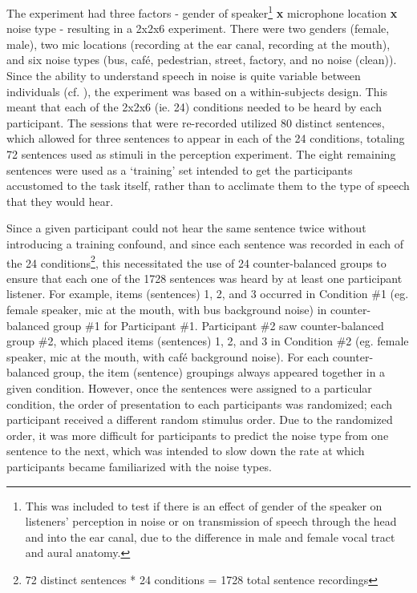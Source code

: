 The experiment had three factors - gender of speaker\footnote{This was included to test if there is an effect of gender of the speaker on listeners' perception in noise or on transmission of speech through the head and into the ear canal, due to the difference in male and female vocal tract and aural anatomy.} \textbf{x} microphone location \textbf{x} noise type - resulting in a 2x2x6 experiment.  There were two genders (female, male), two mic locations (recording at the ear canal, recording at the mouth), and six noise types (bus, caf\'{e}, pedestrian, street, factory, and no noise (clean)).  Since the ability to understand speech in noise is quite variable between individuals (cf. \cite{ding:13,gilbert:13}), the experiment was based on a within-subjects design.  This meant that each of the 2x2x6 (ie. 24) conditions needed to be heard by each participant.  The sessions that were re-recorded utilized 80 distinct sentences, which allowed for three sentences to appear in each of the 24 conditions, totaling 72 sentences used as stimuli in the perception experiment.  The eight remaining sentences were used as a `training' set intended to get the participants accustomed to the task itself, rather than to acclimate them to the type of speech that they would hear.

Since a given participant could not hear the same sentence twice without introducing a training confound, and since each sentence was recorded in each of the 24 conditions\footnote{72 distinct sentences * 24 conditions = 1728 total sentence recordings}, this necessitated the use of 24 counter-balanced groups to ensure that each one of the 1728 sentences was heard by at least one participant listener.  For example, items (sentences) 1, 2, and 3 occurred in Condition \#1 (eg. female speaker, mic at the mouth, with bus background noise) in counter-balanced group \#1 for Participant \#1. Participant \#2 saw counter-balanced group \#2, which placed items (sentences) 1, 2, and 3 in Condition \#2 (eg. female speaker, mic at the mouth, with caf\'{e} background noise).  For each counter-balanced group, the item (sentence) groupings always appeared together in a given condition.  However, once the sentences were assigned to a particular condition, the order of presentation to each participants was randomized; each participant received a different random stimulus order.  Due to the randomized order, it was more difficult for participants to predict the noise type from one sentence to the next, which was intended to slow down the rate at which participants became familiarized with the noise types.

